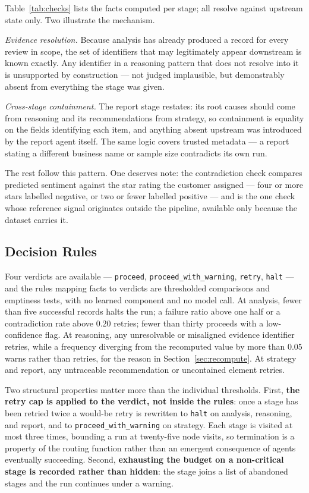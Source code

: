 \documentclass[runningheads]{llncs}
\begin{document}
Table~\ref{tab:checks} lists the facts computed per stage; all resolve against
upstream state only. Two illustrate the mechanism.

\emph{Evidence resolution.} Because analysis has already produced a record for
every review in scope, the set of identifiers that may legitimately appear
downstream is known exactly. Any identifier in a reasoning pattern that does not
resolve into it is unsupported by construction --- not judged implausible, but
demonstrably absent from everything the stage was given.

\emph{Cross-stage containment.} The report stage restates: its root causes should
come from reasoning and its recommendations from strategy, so containment is
equality on the fields identifying each item, and anything absent upstream was
introduced by the report agent itself. The same logic covers trusted metadata ---
a report stating a different business name or sample size contradicts its own run.

The rest follow this pattern. One deserves note: the contradiction check compares
predicted sentiment against the star rating the customer assigned --- four or more
stars labelled negative, or two or fewer labelled positive --- and is the one
check whose reference signal originates outside the pipeline, available only
because the dataset carries it.

\subsection{Decision Rules}
\label{sec:decide}

Four verdicts are available --- \texttt{proceed},
\texttt{proceed\_with\_warning}, \texttt{retry}, \texttt{halt} --- and the rules
mapping facts to verdicts are thresholded comparisons and emptiness tests, with
no learned component and no model call. At analysis, fewer than five successful
records halts the run; a failure ratio above one half or a contradiction rate
above $0.20$ retries; fewer than thirty proceeds with a low-confidence flag. At
reasoning, any unresolvable or misaligned evidence identifier retries, while a
frequency diverging from the recomputed value by more than $0.05$ warns rather
than retries, for the reason in Section~\ref{sec:recompute}. At strategy and
report, any untraceable recommendation or uncontained element retries.

Two structural properties matter more than the individual thresholds. First,
\textbf{the retry cap is applied to the verdict, not inside the rules}: once a
stage has been retried twice a would-be retry is rewritten to \texttt{halt} on
analysis, reasoning, and report, and to \texttt{proceed\_with\_warning} on
strategy. Each stage is visited at most three times, bounding a run at twenty-five
node visits, so termination is a property of the routing function rather than an
emergent consequence of agents eventually succeeding. Second, \textbf{exhausting
the budget on a non-critical stage is recorded rather than hidden}: the stage
joins a list of abandoned stages and the run continues under a warning.
\end{document}
